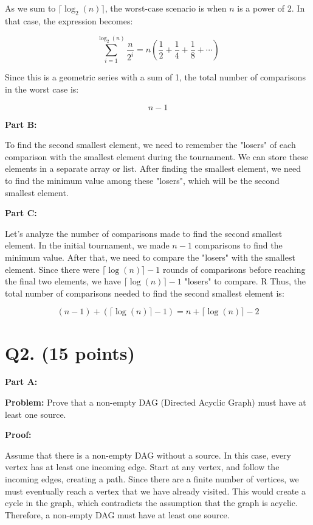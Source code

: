 \documentclass[11pt]{article}
\begin{document}
    As we sum to $\lceil\log_2(n)\rceil$, the worst-case scenario is when $n$ is a power of 2. In that case, the expression becomes:

    $$
    \sum_{i=1}^{\log_2(n)} \frac{n}{2^i} = n\left(\frac{1}{2} + \frac{1}{4} + \frac{1}{8} + \cdots\right)
    $$

    Since this is a geometric series with a sum of 1, the total number of comparisons in the worst case is:

    $$
    n - 1
    $$

    \textbf{Part B:}

    To find the second smallest element, we need to remember the "losers" of each comparison with the smallest element during the tournament. We can store these elements in a separate array or list. After finding the smallest element, we need to find the minimum value among these "losers", which will be the second smallest element.

    \textbf{Part C:}

    Let's analyze the number of comparisons made to find the second smallest element. In the initial tournament, we made $n - 1$ comparisons to find the minimum value. After that, we need to compare the "losers" with the smallest element. Since there were $\lceil\log(n)\rceil - 1$ rounds of comparisons before reaching the final two elements, we have $\lceil\log(n)\rceil - 1$ "losers" to compare.
    R
    Thus, the total number of comparisons needed to find the second smallest element is:

    $$
    (n - 1) + (\lceil\log(n)\rceil - 1) = n + \lceil\log(n)\rceil - 2
    $$

    \section{Q2. (15 points)}

\textbf{Part A:}

\textbf{Problem:} Prove that a non-empty DAG (Directed Acyclic Graph) must have at least one source.

\textbf{Proof:}

Assume that there is a non-empty DAG without a source. In this case, every vertex has at least one incoming edge. Start at any vertex, and follow the incoming edges, creating a path. Since there are a finite number of vertices, we must eventually reach a vertex that we have already visited. This would create a cycle in the graph, which contradicts the assumption that the graph is acyclic. Therefore, a non-empty DAG must have at least one source.
\end{document}
